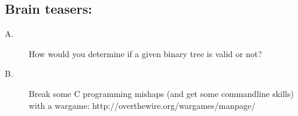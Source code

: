 \documentclass{article}
\begin{document}
\subsection*{Brain teasers:}
\begin{description}
\item[A.] How would you determine if a given binary tree is valid or not? %

\item[B.] Break some C programming mishaps (and get some commandline skills) with a wargame: http://overthewire.org/wargames/manpage/

\end{description}
\end{document}
